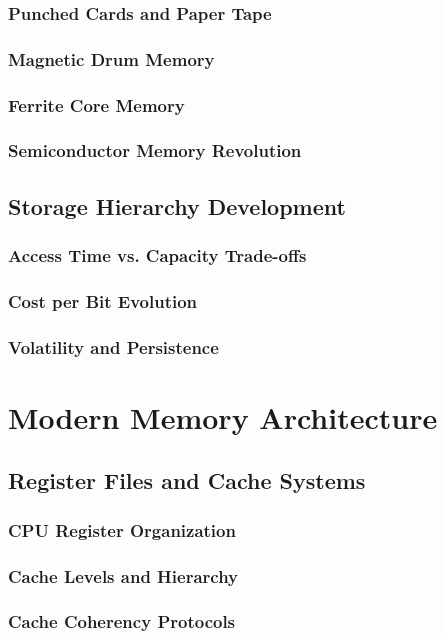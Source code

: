 \documentclass[12pt, oneside, openany]{book}
\begin{document}
\subsubsection{Punched Cards and Paper Tape}
\subsubsection{Magnetic Drum Memory}
\subsubsection{Ferrite Core Memory}
\subsubsection{Semiconductor Memory Revolution}

\subsection{Storage Hierarchy Development}
\subsubsection{Access Time vs. Capacity Trade-offs}
\subsubsection{Cost per Bit Evolution}
\subsubsection{Volatility and Persistence}

\section{Modern Memory Architecture}
\subsection{Register Files and Cache Systems}
\subsubsection{CPU Register Organization}
\subsubsection{Cache Levels and Hierarchy}
\subsubsection{Cache Coherency Protocols}
\end{document}
